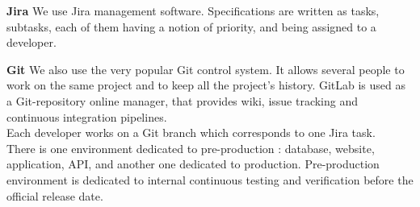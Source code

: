 \documentclass{article}
\begin{document}
                \textbf{Jira} \newline
                We use Jira management software. Specifications are written as tasks, subtasks,
                each of them having a notion of priority, and being assigned to a developer. \newline

                \textbf{Git} \newline
                We also use the very popular Git control system. It allows several people to work
                on the same project and to keep all the project's history. GitLab is used as a Git-repository
                online manager, that provides wiki, issue tracking and continuous integration pipelines.\\
                Each developer works on a Git branch which corresponds to one Jira task.\\
                
                
                There is one environment
                dedicated to pre-production : database, website, application, API, and another one dedicated to production.
                Pre-production environment is dedicated to internal continuous testing and verification before the official release date.
\end{document}
